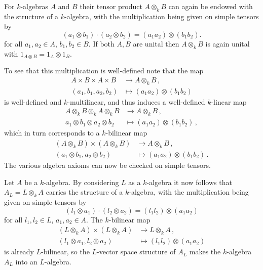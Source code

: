 \begin{fluff}
  For $k$-algebras $A$ and $B$ their tensor product $A \otimes_k B$ can again be endowed with the structure of a $k$-algebra, with the multiplication being given on simple tensors by
  \[
      (a_1 \otimes b_1) \cdot (a_2 \otimes b_2)
    = (a_1 a_2) \otimes (b_1 b_2).
  \]
  for all $a_1, a_2 \in A$, $b_1, b_2 \in B$.
  If both $A, B$ are unital then $A \otimes_k B$ is again unital with $1_{A \otimes B} = 1_A \otimes 1_B$.
  
  To see that this multiplication is well-defined note that the map
  \begin{align*}
              A \times B \times A \times B
    &\to      A \otimes_k B \,, \\
              (a_1, b_1, a_2, b_2)
    &\mapsto  (a_1 a_2) \otimes (b_1 b_2)
  \end{align*}
  is well-defined and $k$-multilinear, and thus induces a well-defined $k$-linear map
  \begin{align*}
              A \otimes_k B \otimes_k A \otimes_k B
    &\to      A \otimes_k B \,, \\
              a_1 \otimes b_1 \otimes a_2 \otimes b_2
    &\mapsto  (a_1 a_2) \otimes (b_1 b_2) \,,
  \end{align*}
  which in turn corresponds to a $k$-bilinear map
  \begin{align*}
              (A \otimes_k B) \times (A \otimes_k B)
    &\to      A \otimes_k B \,, \\
              (a_1 \otimes b_1, a_2 \otimes b_2)
    &\mapsto  (a_1 a_2) \otimes (b_1 b_2) \,.
  \end{align*}
  The various algebra axioms can now be checked on simple tensors.
\end{fluff}

\begin{fluff}
  Let $A$ be a $k$-algebra.
  By considering $L$ as a $k$-algebra it now follows that $A_L = L \otimes_k A$ carries the structure of a $k$-algebra, with the multiplication being given on simple tensors by
  \[
      (l_1 \otimes a_1) \cdot (l_2 \otimes a_2)
    = (l_1 l_2) \otimes (a_1 a_2)
  \]
  for all $l_1, l_2 \in L$, $a_1, a_2 \in A$.
  The $k$-bilinear map
  \begin{align*}
              (L\otimes_k A) \times (L \otimes_k A)
    &\to      L \otimes_k A \,, \\
              (l_1 \otimes a_1, l_2 \otimes a_2)
    &\mapsto  (l_1 l_2) \otimes (a_1 a_2)
  \end{align*}
  is already $L$-bilinear, so the $L$-vector space structure of $A_L$ makes the $k$-algebra $A_L$ into an $L$-algebra.
\end{fluff}


